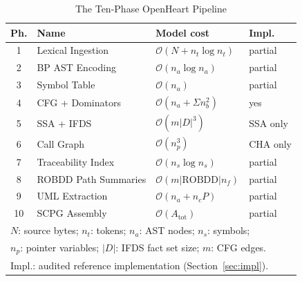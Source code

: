 \documentclass[journal,10pt,twoside]{IEEEtran}
\newcommand{\ROBDD}{\mathrm{ROBDD}}
\newcommand{\BigO}{\mathcal{O}}
\begin{document}
\begin{table}[!t]
\renewcommand{\arraystretch}{1.25}
\caption{The Ten-Phase OpenHeart Pipeline}
\label{tab:pipeline}
\centering
\small
\begin{tabular}{@{}c@{\,}l@{\;}l@{\;}l@{}}
\toprule
\textbf{Ph.} & \textbf{Name} & \textbf{Model cost}
  & \textbf{Impl.}\\
\midrule
1  & Lexical Ingestion   & $\BigO(N + n_t\log n_t)$  & partial\\
2  & BP AST Encoding     & $\BigO(n_a\log n_a)$      & partial\\
3  & Symbol Table        & $\BigO(n_a)$              & partial\\
4  & CFG + Dominators    & $\BigO(n_a + \Sigma n_b^2)$& yes\\
5  & SSA + IFDS          & $\BigO(m|D|^3)$           & SSA only\\
6  & Call Graph          & $\BigO(n_p^{3})$          & CHA only\\
7  & Traceability Index  & $\BigO(n_s\log n_s)$      & partial\\
8  & ROBDD Path Summaries& $\BigO(m|\ROBDD|n_f)$     & partial\\
9  & UML Extraction      & $\BigO(n_a + n_c P)$      & partial\\
10 & SCPG Assembly       & $\BigO(A_{\mathrm{tot}})$ & partial\\
\bottomrule
\multicolumn{4}{l}{\scriptsize $N$: source bytes; $n_t$: tokens;
  $n_a$: AST nodes; $n_s$: symbols;}\\
\multicolumn{4}{l}{\scriptsize $n_p$: pointer variables;
  $|D|$: IFDS fact set size; $m$: CFG edges.}\\
\multicolumn{4}{l}{\scriptsize Impl.: audited reference
  implementation (Section~\ref{sec:impl}).}
\end{tabular}
\end{table}
\end{document}
